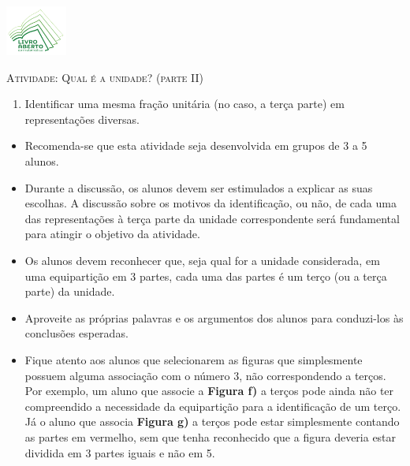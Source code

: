 \documentclass[10 pt,usenames,dvipsnames, oneside]{article}
\begin{document}
\begin{center}
  \begin{minipage}[l]{3cm}
\includegraphics[width=2cm]{logo}    
\end{minipage}\hfill
\begin{minipage}[r]{.8\textwidth}
 {\Large \scshape Atividade: Qual é a unidade? (parte II)}  
\end{minipage}
\end{center}
\vspace{.2cm}

\ifdefined\prof
\begin{goals}
\begin{enumerate}

\item       Identificar uma mesma fração unitária (no caso, a terça parte) em representações diversas.

\end{enumerate}
\tcblower

\begin{itemize}
\item       Recomenda-se que esta atividade seja desenvolvida em grupos de 3 a 5 alunos.
\item       Durante a discussão, os alunos devem ser estimulados a explicar as suas escolhas. A discussão sobre os motivos da identificação, ou não, de cada uma das representações à terça parte da unidade correspondente será fundamental para atingir o objetivo da atividade.
\item       Os alunos devem reconhecer que, seja qual for a unidade considerada, em uma equipartição em 3 partes, cada uma das partes é um terço (ou a terça parte) da unidade.
\item       Aproveite as próprias palavras e os argumentos dos alunos para conduzi-los às conclusões esperadas.
\item       Fique atento aos alunos que selecionarem as figuras que simplesmente possuem alguma associação com o número 3, não correspondendo a terços. Por exemplo, um aluno que associe a       {\bf Figura f)} a terços pode ainda não ter compreendido a necessidade da equipartição para a identificação de um terço. Já o aluno que associa       {\bf Figura g)}       a terços pode estar simplesmente contando as partes em vermelho, sem que tenha reconhecido que a figura deveria estar dividida em 3 partes iguais e não em 5.
\end{itemize}


\end{goals}
\end{document}
